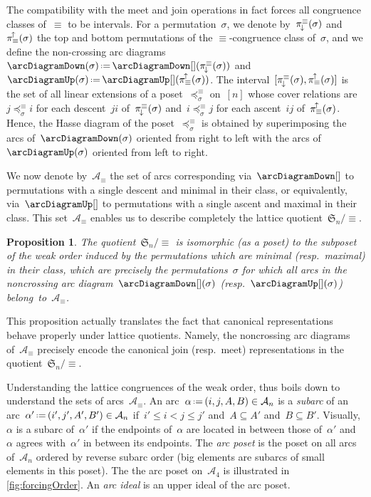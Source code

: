\documentclass{amsart}
\newtheorem{proposition}[theorem]{Proposition}
\theoremstyle{definition}
\newcommand{\f}[1]{{\mathfrak{#1}}} %
\newcommand{\eqdef}{\mbox{\,\raisebox{0.2ex}{\scriptsize\ensuremath{\mathrm:}}\ensuremath{=}\,}} %
\newcommand{\darkblue}{\color{darkblue}} %
\newcommand{\defn}[1]{\textsl{\darkblue #1}} %
\newcommand{\arc}{\alpha} %
\newcommand{\arcs}{{\mathcal{A}}} %
\newcommand{\projDown}{\smash{\pi^{\equiv}_{\!\downarrow\!}}} %
\newcommand{\projUp}{\smash{\pi_{\equiv}^{\!\uparrow\!}}} %
\begin{document}
The compatibility with the meet and join operations in fact forces all congruence classes of~$\equiv$ to be intervals.
For a permutation~$\sigma$, we denote by~$\projDown(\sigma)$ and~$\projUp(\sigma)$ the top and bottom permutations of the $\equiv$-congruence class of~$\sigma$, and we define the non-crossing arc diagrams~$\arcDiagramDown(\sigma) \eqdef \arcDiagramDown[](\projDown(\sigma))$ and~$\arcDiagramUp(\sigma) \eqdef \arcDiagramUp[](\projUp(\sigma))$.
The interval~$[\projDown(\sigma), \projUp(\sigma)]$ is the set of all linear extensions of a poset~$\preccurlyeq^\equiv_\sigma$ on~$[n]$ whose cover relations are~$j \preccurlyeq^\equiv_\sigma i$ for each descent~$ji$ of~$\projDown(\sigma)$ and~$i \preccurlyeq^\equiv_\sigma j$ for each ascent~$ij$ of~$\projUp(\sigma)$.
Hence, the Hasse diagram of the poset~$\preccurlyeq^\equiv_\sigma$ is obtained by superimposing the arcs of~$\arcDiagramDown(\sigma)$ oriented from right to left with the arcs of~$\arcDiagramUp(\sigma)$ oriented from left to right.

We now denote by~$\arcs_\equiv$ the set of arcs corresponding via~$\arcDiagramDown[]$ to permutations with a single descent and minimal in their class, or equivalently, via~$\arcDiagramUp[]$ to permutations with a single ascent and maximal in their class.
This set~$\arcs_\equiv$ enables us to describe completely the lattice quotient~$\f{S}_n / {\equiv}$.

\begin{proposition}
The quotient~$\f{S}_n/{\equiv}$ is isomorphic (as a poset) to the subposet of the weak order induced by the permutations which are minimal (resp.~maximal) in their class, which are precisely the permutations~$\sigma$ for which all arcs in the noncrossing arc diagram~$\arcDiagramDown[](\sigma)$ (resp.~$\arcDiagramUp[](\sigma)$) belong~to~$\arcs_\equiv$.
\end{proposition}

This proposition actually translates the fact that canonical representations behave properly under lattice quotients.
Namely, the noncrossing arc diagrams of~$\arcs_\equiv$ precisely encode the canonical join (resp.~meet) representations in the quotient~$\f{S}_n/{\equiv}$.

Understanding the lattice congruences of the weak order, thus boils down to understand the sets of arcs~$\arcs_\equiv$.
An arc~$\arc \eqdef (i, j, A, B) \in \arcs_n$ is a \defn{subarc} of an arc~$\arc' \eqdef (i', j', A', B') \in \arcs_n$ if~$i' \le i < j \le j'$ and~${A \subseteq A'}$ and~${B \subseteq B'}$.
Visually, $\arc$ is a subarc of~$\arc'$ if the endpoints of~$\arc$ are located in between those of~$\arc'$ and~$\arc$ agrees with~$\arc'$ in between its endpoints.
The \defn{arc poset} is the poset on all arcs of~$\arcs_n$ ordered by reverse subarc order (big elements are subarcs of small elements in this poset).
The the arc poset on~$\arcs_4$ is illustrated in \cref{fig:forcingOrder}.
An \defn{arc ideal} is an upper ideal of the arc poset.
\end{document}
